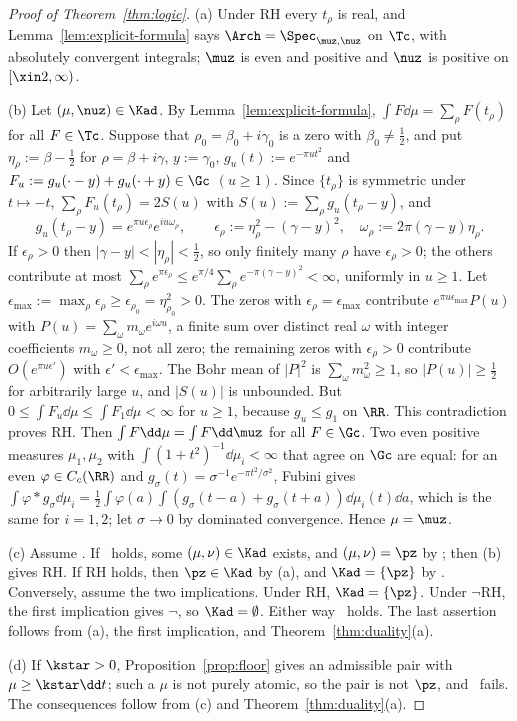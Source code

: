 \begin{proof}[Proof of Theorem~\textup{\ref{thm:logic}}]
(a) Under RH every $t_\rho$ is real, and Lemma~\ref{lem:explicit-formula} says $\Arch=\Spec_{\muz,\nuz}$ on $\Tc$, with
absolutely convergent integrals; $\muz$ is even and positive and $\nuz$ is positive on $[\xin2,\infty)$.

(b) Let $(\mu,\nuz)\in\Kad$. By Lemma~\ref{lem:explicit-formula}, $\int F\dd\mu=\sum_\rho F(t_\rho)$ for all $F\in\Tc$.
Suppose that $\rho_0=\beta_0+i\gamma_0$ is a zero with $\beta_0\ne\frac12$, and put $\eta_\rho:=\beta-\frac12$ for
$\rho=\beta+i\gamma$, $y:=\gamma_0$, $g_u(t):=e^{-\pi ut^2}$ and $F_u:=g_u(\cdot-y)+g_u(\cdot+y)\in\Gc$ $(u\ge1)$. Since
$\{t_\rho\}$ is symmetric under $t\mapsto-t$, $\sum_\rho F_u(t_\rho)=2S(u)$ with $S(u):=\sum_\rho g_u(t_\rho-y)$, and
\[
g_u(t_\rho-y)=e^{\pi u\epsilon_\rho}e^{iu\omega_\rho},\qquad \epsilon_\rho:=\eta_\rho^2-(\gamma-y)^2,\quad \omega_\rho:=2\pi(\gamma-y)\eta_\rho .
\]
If $\epsilon_\rho>0$ then $|\gamma-y|<|\eta_\rho|<\frac12$, so only finitely many $\rho$ have $\epsilon_\rho>0$; the others contribute
at most $\sum_\rho e^{\pi \epsilon_\rho}\le e^{\pi/4}\sum_\rho e^{-\pi(\gamma-y)^2}<\infty$, uniformly in $u\ge1$. Let
$\epsilon_{\max}:=\max_\rho \epsilon_\rho\ge \epsilon_{\rho_0}=\eta_{\rho_0}^2>0$. The zeros with $\epsilon_\rho=\epsilon_{\max}$ contribute
$e^{\pi u\epsilon_{\max}}P(u)$ with $P(u)=\sum_\omega m_\omega e^{i\omega u}$, a finite sum over distinct real $\omega$ with
integer coefficients $m_\omega\ge0$, not all zero; the remaining zeros with $\epsilon_\rho>0$ contribute
$O(e^{\pi u\epsilon'})$ with $\epsilon'<\epsilon_{\max}$. The Bohr mean of $|P|^2$ is $\sum_\omega m_\omega^2\ge1$, so $|P(u)|\ge\frac12$ for
arbitrarily large $u$, and $|S(u)|$ is unbounded. But $0\le\int F_u\dd\mu\le\int F_1\dd\mu<\infty$ for $u\ge1$, because
$g_u\le g_1$ on $\RR$. This contradiction proves RH. Then $\int F\dd\mu=\int F\dd\muz$ for all $F\in\Gc$. Two even
positive measures $\mu_1,\mu_2$ with $\int(1+t^2)^{-1}\dd\mu_i<\infty$ that agree on $\Gc$ are equal: for an even
$\varphi\in C_c(\RR)$ and $g_\sigma(t)=\sigma^{-1}e^{-\pi t^2/\sigma^2}$, Fubini gives
$\int\varphi*g_\sigma\dd\mu_i=\frac12\int\varphi(a)\int(g_\sigma(t-a)+g_\sigma(t+a))\dd\mu_i(t)\dd a$, which is the same for
$i=1,2$; let $\sigma\to0$ by dominated convergence. Hence $\mu=\muz$.

(c) Assume \condU. If \condE\ holds, some $(\mu,\nu)\in\Kad$ exists, and $(\mu,\nu)=\pz$ by \condU; then (b) gives RH. If
RH holds, then $\pz\in\Kad$ by (a), and $\Kad=\{\pz\}$ by \condU. Conversely, assume the two implications. Under RH,
$\Kad=\{\pz\}$. Under $\neg$RH, the first implication gives $\neg$\condE, so $\Kad=\emptyset$. Either way \condU\ holds. The
last assertion follows from (a), the first implication, and Theorem~\ref{thm:duality}(a).

(d) If $\kstar>0$, Proposition~\ref{prop:floor} gives an admissible pair with $\mu\ge\kstar\dd t$; such a $\mu$ is not
purely atomic, so the pair is not $\pz$, and \condU\ fails. The consequences follow from (c) and
Theorem~\ref{thm:duality}(a).
\end{proof}

